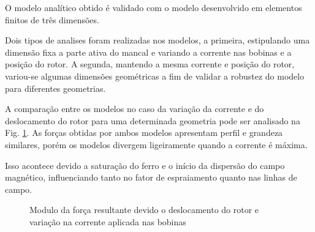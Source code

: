 O modelo analítico obtido é validado com o modelo desenvolvido em elementos finitos de três dimensões.

Dois tipos de analises foram realizadas nos modelos, a primeira, estipulando uma dimensão fixa a parte ativa do mancal e variando a corrente nas bobinas e a posição do rotor. A segunda, mantendo a mesma corrente e posição do rotor, variou-se algumas dimensões geométricas a fim de validar a robustez do modelo para diferentes geometrias.

A comparação entre os modelos no caso da variação da corrente e do deslocamento do rotor para uma determinada geometria pode ser analisado na Fig. \ref{Fig:simulacoes:ativo:comparacao:dx:i}. As forças obtidas por ambos modelos apresentam perfil e grandeza similares, porém os modelos divergem ligeiramente quando a corrente é máxima.

Isso acontece devido a saturação do ferro e o início da dispersão do campo magnético, influenciando tanto no fator de espraiamento quanto nas linhas de campo. 

	\begin{figure}[!ht]
		
		\caption{Modulo da força resultante devido o deslocamento do rotor e variação na corrente aplicada nas bobinas}
		\label{Fig:simulacoes:ativo:comparacao:dx:i}
	\end{figure}

